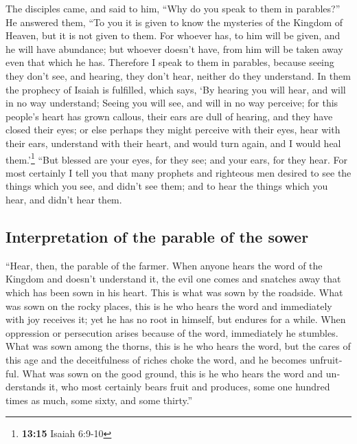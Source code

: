 \begin{paracol}{2}
\begin{otherlanguage}{english}
 The disciples came, and said to him, ``Why do you speak
to them in parables?''  He answered them, ``To you it is
given to know the mysteries of the Kingdom of Heaven, but it is not
given to them.  For whoever has, to him will be given,
and he will have abundance; but whoever doesn't have, from him will be
taken away even that which he has.  Therefore I speak to
them in parables, because seeing they don't see, and hearing, they don't
hear, neither do they understand.  In them the prophecy
of Isaiah is fulfilled, which says, `By hearing you will hear, and will
in no way understand; Seeing you will see, and will in no way perceive;
 for this people's heart has grown callous, their ears
are dull of hearing, and they have closed their eyes; or else perhaps
they might perceive with their eyes, hear with their ears, understand
with their heart, and would turn again, and I would heal
them.'\footnote{\textbf{13:15} Isaiah 6:9-10}  ``But
blessed are your eyes, for they see; and your ears, for they hear.
 For most certainly I tell you that many prophets and
righteous men desired to see the things which you see, and didn't see
them; and to hear the things which you hear, and didn't hear them.

\hypertarget{interpretation-of-the-parable-of-the-sower}{%
\subsection{Interpretation of the parable of the
sower}\label{interpretation-of-the-parable-of-the-sower}}

 ``Hear, then, the parable of the farmer. 
When anyone hears the word of the Kingdom and doesn't understand it, the
evil one comes and snatches away that which has been sown in his heart.
This is what was sown by the roadside.  What was sown on
the rocky places, this is he who hears the word and immediately with joy
receives it;  yet he has no root in himself, but endures
for a while. When oppression or persecution arises because of the word,
immediately he stumbles.  What was sown among the thorns,
this is he who hears the word, but the cares of this age and the
deceitfulness of riches choke the word, and he becomes unfruitful.
 What was sown on the good ground, this is he who hears
the word and understands it, who most certainly bears fruit and
produces, some one hundred times as much, some sixty, and some thirty.''


\end{otherlanguage}
\end{paracol}
